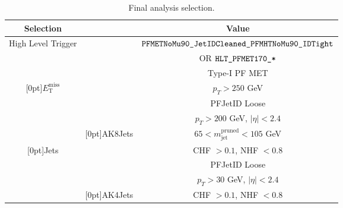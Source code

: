 \def\arraystretch{1.2}
\begin{table}[h]
\begin{footnotesize}
\caption{Final analysis selection.}
\label{tab:finalsel}
\begin{tabular}{|c|cc|}
\hline
\textbf{Selection}                     &                                       &       \textbf{Value}                                                   \\  \hline
High Level Trigger                     &                                       &      $\verb|PFMETNoMu90_JetIDCleaned_PFMHTNoMu90_IDTight|$      \\ 
                                       &                                       &       OR $\verb|HLT_PFMET170_*|$                               \\ \hline
                                       &                                       &      Type-I PF MET                                            \\      
\raisebox{1.5ex}[0pt]{$E_{\text{T}}^{\text{miss}}$} &                          &      $p_{T} > 250$ GeV                                        \\ \cline{1-3}
                                       &                                       &      PFJetID Loose                                            \\  
                                       &                                       &      $p_{T} > 200$ GeV, $\left|\eta\right|< 2.4$               \\  
                                       & \raisebox{1.5ex}[0pt]{AK8Jets}              &      $ 65 < m^{\text{pruned}}_{\text{jet}} < 105$ GeV           \\  
\raisebox{1.5ex}[0pt]{Jets}            &                                       &      CHF $> 0.1$, NHF $< 0.8$                                   \\  \cline{2-3}
                                       &                                       &      PFJetID Loose                                            \\  
                                       &                                       &      $p_{T} > 30$ GeV, $\left|\eta\right|< 2.4$               \\  
                                       &  \raisebox{1.5ex}[0pt]{AK4Jets}       &      CHF $> 0.1$, NHF $< 0.8$        \\
                                       

\end{tabular}
\end{footnotesize}
\end{table}
